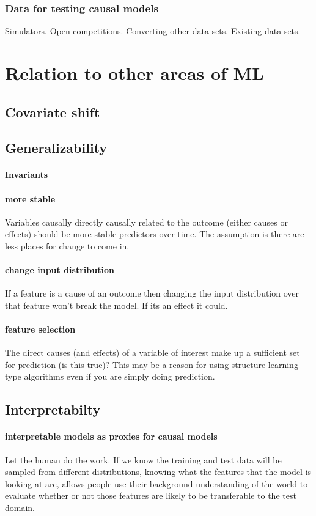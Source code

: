 \documentclass[11pt,a4paper]{book}
\begin{document}
\subsubsection*{Data for testing causal models}
Simulators. Open competitions. Converting other data sets. Existing data sets.

\section*{Relation to other areas of ML}
\subsection*{Covariate shift}
\subsection*{Generalizability}
\paragraph*{Invariants}
\paragraph{more stable} Variables causally directly causally related to the outcome (either causes or effects) should be more stable predictors over time. The assumption is there are less places for change to come in. 

\paragraph{change input distribution}If a feature is a cause of an outcome then changing the input distribution over that feature won't break the model. If its an effect it could.

\paragraph{feature selection} The direct causes (and effects) of a variable of interest make up a sufficient set for prediction (is this true)? This may be a reason for using structure learning type algorithms even if you are simply doing prediction.
\subsection*{Interpretabilty}
\paragraph*{interpretable models as proxies for causal models} Let the human do the work. If we know the training and test data will be sampled from different distributions, knowing what the features that the model is looking at are, allows people use their background understanding of the world to evaluate whether or not those features are likely to be transferable to the test domain. 
\end{document}
